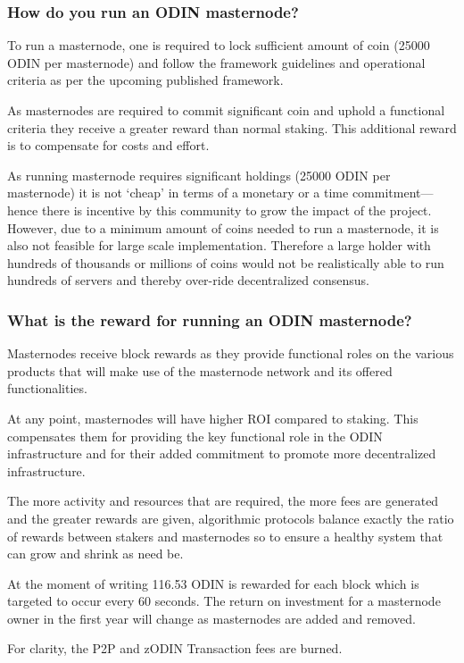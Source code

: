 \documentclass[12pt,letterpaper]{article}
\begin{document}
\subsubsection{How do you run an ODIN masternode?}
To run a masternode, one is required to lock sufficient amount of coin (\num{25000} ODIN per masternode) and follow the framework guidelines and operational criteria as per the upcoming published framework.

As masternodes are required to commit significant coin and uphold a functional criteria they receive a greater reward than normal staking.  This additional reward is to compensate for costs and effort. 

As running masternode requires significant holdings (\num{25000} ODIN per masternode) it is not `cheap' in terms of a monetary or a time commitment---hence there is incentive by this community to grow the impact of the project. However, due to a minimum amount of coins needed to run a masternode, it is also not feasible for large scale implementation. Therefore a large holder with hundreds of thousands or millions of coins would not be realistically able to run hundreds of servers and thereby over-ride decentralized consensus.  

\subsubsection{What is the reward for running an ODIN masternode?}
Masternodes receive block rewards as they provide functional roles on the various products that will make use of the masternode network and its offered functionalities. 
 
At any point, masternodes will have higher ROI compared to staking. This compensates them for providing the key functional role in the ODIN infrastructure and for their added commitment to promote more decentralized infrastructure.

The more activity and resources that are required, the more fees are generated and the greater rewards are given, algorithmic protocols balance exactly the ratio of rewards between stakers and masternodes so to ensure a healthy system that can grow and shrink as need be.

At the moment of writing 116.53 ODIN is rewarded for each block which is targeted to occur every 60 seconds. The return on investment for a masternode owner in the first year will change as masternodes are added and removed.

For clarity, the P2P and zODIN Transaction fees are burned.
\end{document}
